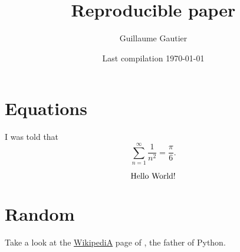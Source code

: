 \documentclass{article}
\begin{document}

\title{Reproducible paper}

\author{Guillaume Gautier}

\date{ Last compilation \today }

\maketitle




\section{Equations} %
\label{sec:equations}

	I was told that
	\begin{equation}
		\sum_{n=1}^{\infty} \frac{1}{n^2} = \frac{\pi}{6}.
	\end{equation}

	\begin{equation}
		\text{Hello World!}
	\end{equation}


\section{Random} %
\label{sec:random}

	Take a look at the \href{https://en.wikipedia.org/wiki/Linus_Torvalds}{WikipediA} page of \citet{Python}, the father of Python.





\end{document}
